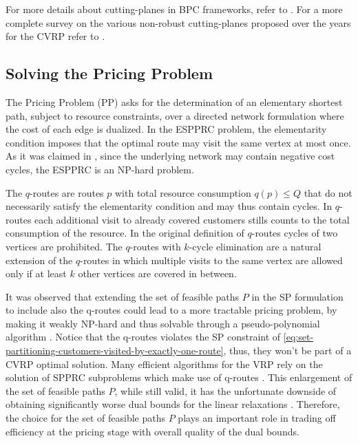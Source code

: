 For more details about cutting-planes in BPC frameworks,
refer to \textcite{desaulniers2011}.
For a more complete survey on the various non-robust cutting-planes
proposed over the years for the CVRP refer to \textcite{costa2019}.

\subsection{Solving the Pricing Problem}
\label{sec:intro-solving-the-pricing-problem}

The Pricing Problem (PP) asks for the determination of an elementary shortest path,
subject to resource constraints,
over a directed network formulation where the cost of each edge
is dualized.
In the ESPPRC problem, the elementarity condition imposes
that the optimal route may visit the same vertex at most once.
As it was claimed in \textcite{dror1994},
since the underlying network may contain negative cost cycles,
the ESPPRC is an NP-hard problem.

\medskip

The $q$-routes \parencite{christofides1981exact}
are routes $p$ with total resource consumption $q(p) \le Q$
that do not necessarily satisfy the elementarity condition and may thus contain cycles.
In $q$-routes each additional visit to already covered customers
stills counts to the total consumption of the resource.
In the original definition of $q$-routes cycles of two vertices are prohibited.
The $q$-routes with $k$-cycle elimination
are a natural extension of the $q$-routes
in which multiple visits to the same vertex are allowed only
if at least $k$ other vertices are covered in between.

It was observed that extending the set of feasible paths $P$ in
the SP formulation to include also the q-routes could lead to a
more tractable pricing problem, by making it weakly NP-hard
and thus solvable through a pseudo-polynomial algorithm \parencite{desrochers1988, irnich2005}.
Notice that the q-routes violates the SP constraint of \cref{eq:set-partitioning-customers-visited-by-exactly-one-route},
thus, they won't be part of a CVRP optimal solution.
Many efficient algorithms for the VRP
rely on the solution of SPPRC subproblems which
make use of q-routes  \parencite{desrochers1992, feillet2004, fukasawa2006,contardo2011}.
This enlargement of the set of feasible paths $P$,
while still valid,
it has the unfortunate downside
of obtaining significantly worse dual bounds for the linear relaxations \parencite{feillet2004}.
Therefore, the choice for the set of feasible paths $P$ plays an important
role in trading off efficiency at the pricing stage with
overall quality of the dual bounds.

